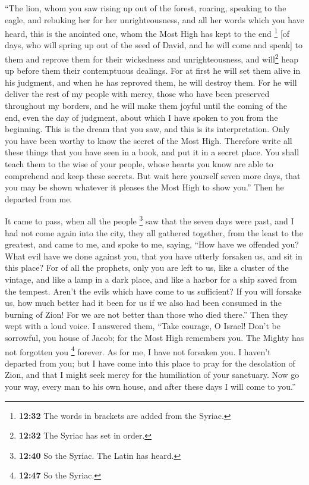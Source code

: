  ``The lion, whom you saw rising up out of the forest,
roaring, speaking to the eagle, and rebuking her for her
unrighteousness, and all her words which you have heard, 
this is the anointed one, whom the Most High has kept to the end
\footnote{\textbf{12:32} The words in brackets are added from the
  Syriac.} {[}of days, who will spring up out of the seed of David, and
he will come and speak{]} to them and reprove them for their wickedness
and unrighteousness, and will\footnote{\textbf{12:32} The Syriac has set
  in order.} heap up before them their contemptuous dealings.
 For at first he will set them alive in his judgment, and
when he has reproved them, he will destroy them.  For he
will deliver the rest of my people with mercy, those who have been
preserved throughout my borders, and he will make them joyful until the
coming of the end, even the day of judgment, about which I have spoken
to you from the beginning.  This is the dream that you
saw, and this is its interpretation.  Only you have been
worthy to know the secret of the Most High.  Therefore
write all these things that you have seen in a book, and put it in a
secret place.  You shall teach them to the wise of your
people, whose hearts you know are able to comprehend and keep these
secrets.  But wait here yourself seven more days, that
you may be shown whatever it pleases the Most High to show you.'' Then
he departed from me.

 It came to pass, when all the people \footnote{\textbf{12:40}
  So the Syriac. The Latin has heard.} saw that the seven days were
past, and I had not come again into the city, they all gathered
together, from the least to the greatest, and came to me, and spoke to
me, saying,  ``How have we offended you? What evil have
we done against you, that you have utterly forsaken us, and sit in this
place?  For of all the prophets, only you are left to us,
like a cluster of the vintage, and like a lamp in a dark place, and like
a harbor for a ship saved from the tempest.  Aren't the
evils which have come to us sufficient?  If you will
forsake us, how much better had it been for us if we also had been
consumed in the burning of Zion!  For we are not better
than those who died there.'' Then they wept with a loud voice. I
answered them,  ``Take courage, O Israel! Don't be
sorrowful, you house of Jacob;  for the Most High
remembers you. The Mighty has not forgotten you \footnote{\textbf{12:47}
  So the Syriac.} forever.  As for me, I have not
forsaken you. I haven't departed from you; but I have come into this
place to pray for the desolation of Zion, and that I might seek mercy
for the humiliation of your sanctuary.  Now go your way,
every man to his own house, and after these days I will come to you.''

